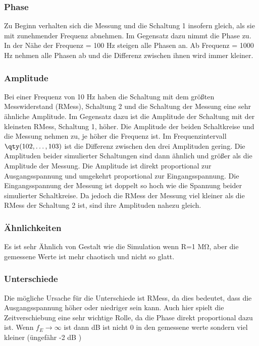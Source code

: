 %
%
\subsubsection{Phase}
Zu Beginn verhalten sich die Messung und die Schaltung 1 insofern gleich, als sie mit zunehmender Frequenz abnehmen. Im Gegensatz dazu nimmt die Phase zu. In der Nähe der Frequenz = 100 Hz steigen alle Phasen an. Ab Frequenz = 1000 Hz nehmen alle Phasen ab und die Differenz zwischen ihnen wird immer kleiner.

\subsubsection{Amplitude}
Bei einer Frequenz von 10 Hz haben die Schaltung mit dem größten Messwiderstand (RMess), Schaltung 2 und die Schaltung der Messung eine sehr ähnliche Amplitude. Im Gegensatz dazu ist die Amplitude der Schaltung mit der kleinsten RMess, Schaltung 1, höher. Die Amplitude der beiden Schaltkreise und die Messung nehmen zu, je höher die Frequenz ist. Im Frequenzintervall $\qty(102,\dots,103)$ ist die Differenz zwischen den drei Amplituden gering. Die Amplituden beider simulierter Schaltungen sind dann ähnlich und größer als die Amplitude der Messung. Die Amplitude ist direkt proportional zur Ausgangsspannung und umgekehrt proportional zur Eingangsspannung. Die Eingangsspannung der Messung ist doppelt so hoch wie die Spannung beider simulierter Schaltkreise. Da jedoch die RMess der Messung viel kleiner als die RMess der Schaltung 2 ist, sind ihre Amplituden nahezu gleich.

\subsubsection{Ähnlichkeiten}
Es ist sehr Ähnlich von Gestalt wie die Simulation wenn R=1 MΩ, aber die gemessene Werte ist mehr chaotisch und nicht so glatt. 


\subsubsection{Unterschiede}
Die mögliche Ursache für die Unterschiede ist RMess, da dies bedeutet, dass die Ausgangsspannung höher oder niedriger sein kann. Auch hier spielt die Zeitverschiebung eine sehr wichtige Rolle, da die Phase direkt proportional dazu ist. Wenn 
$f_E\rightarrow\infty$ ist dann dB ist nicht 0 in den gemessene werte sondern viel kleiner (üngefähr -2 dB  )
%
%
%
\begin{flushright}
  \textit{\autorA}
\end{flushright}
%
%
%
%